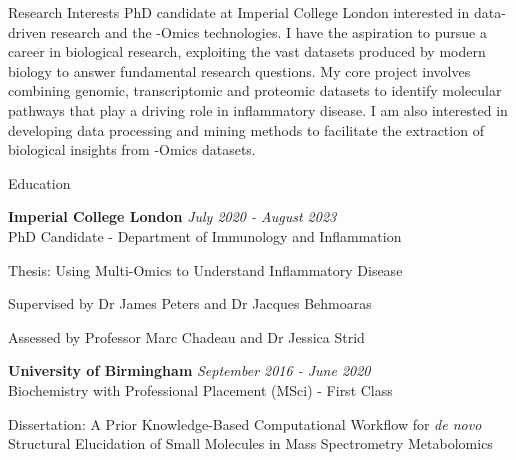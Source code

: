 \documentclass{resume}
\begin{document}
\begin{rSection}{Research Interests}
PhD candidate at Imperial College London interested in data-driven research and the -Omics technologies. I have the aspiration to pursue a career in biological research, exploiting the vast datasets produced by modern biology to answer fundamental research questions. My core project involves combining genomic, transcriptomic and proteomic datasets to identify molecular pathways that play a driving role in inflammatory disease. I am also interested in developing data processing and mining methods to facilitate the extraction of biological insights from -Omics datasets.

\end{rSection}
\begin{rSection}{Education}

\smallskip
{\bf Imperial College London} \hfill {\em July 2020 - August 2023} 
\\ PhD Candidate - Department of Immunology and Inflammation

\smallskip
\item Thesis: Using Multi-Omics to Understand Inflammatory Disease
\item Supervised by Dr James Peters and Dr Jacques Behmoaras 
\item Assessed by Professor Marc Chadeau and Dr Jessica Strid

\medskip

{\bf University of Birmingham} \hfill {\em September 2016 - June 2020} 
\\ Biochemistry with Professional Placement (MSci) - First Class

\smallskip
\item Dissertation: A Prior Knowledge-Based Computational Workflow for \textit{de novo} Structural Elucidation of Small Molecules in Mass Spectrometry Metabolomics

\end{rSection}

\end{document}
